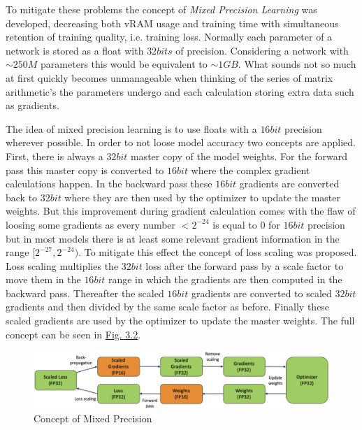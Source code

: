 To mitigate these problems the concept of \textit{Mixed Precision Learning} \cite{mixed_prec} was developed, decreasing both vRAM usage and training time with simultaneous retention of training quality, i.e. training loss. Normally each parameter of a network is stored as a float with $32bits$ of precision. Considering a network with $\sim250M$ parameters this would be equivalent to $\sim1GB$. What sounds not so much at first quickly becomes unmanageable when thinking of the series of matrix arithmetic's the parameters undergo and each calculation storing extra data such as gradients. 

The idea of mixed precision learning is to use floats with a $16bit$ precision wherever possible. In order to not loose model accuracy two concepts are applied. First, there is always a $32bit$ master copy of the model weights. For the forward pass this master copy is converted to $16bit$ where the complex gradient calculations happen. In the backward pass these $16bit$ gradients are converted back to $32bit$ where they are then used by the optimizer to update the master weights. But this improvement during gradient calculation comes with the flaw of loosing some gradients as every number $<2^{-24}$ is equal to $0$ for $16bit$ precision but in most models there is at least some relevant gradient information in the range $[2^{-27},2^{-24})$. To mitigate this effect the concept of loss scaling was proposed. Loss scaling multiplies the $32bit$ loss after the forward pass by a scale factor to move them in the $16bit$ range in which the gradients are then computed in the backward pass. Thereafter the scaled $16bit$ gradients are converted to scaled $32bit$ gradients and then divided by the same scale factor as before. Finally these scaled gradients are used by the optimizer to update the master weights. The full concept can be seen in \hyperref[fig:3.2]{Fig. 3.2}.
%
\begin{figure}[] \label{fig:3.2}
    \centering
    \includegraphics[width=.9\textwidth]{Chapters/figures/mixed_prec.PNG}
    \caption[Short-form caption]{Concept of Mixed Precision}
\end{figure}
%

